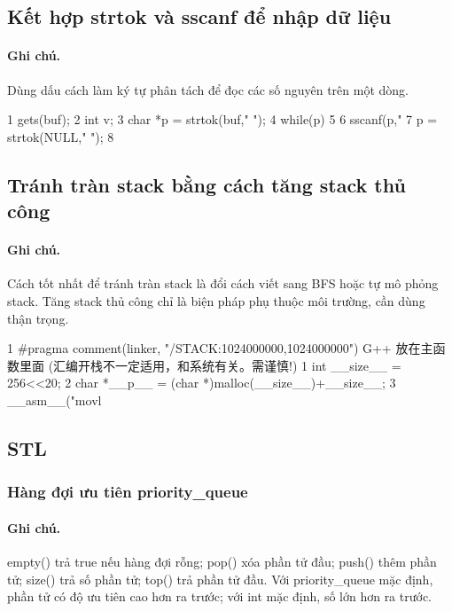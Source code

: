 \documentclass[11pt]{article}
\begin{document}
\subsection{Kết hợp strtok và sscanf để nhập dữ liệu}

\paragraph{Ghi chú.} Dùng dấu cách làm ký tự phân tách để đọc các số nguyên trên một dòng.

\begin{Code}
1               gets(buf);
2               int v;
3               char *p = strtok(buf," ");
4               while(p)
5               {
6                   sscanf(p,"%
7                   p = strtok(NULL," ");
8               }
\end{Code}

\subsection{Tránh tràn stack bằng cách tăng stack thủ công}

\paragraph{Ghi chú.} Cách tốt nhất để tránh tràn stack là đổi cách viết sang BFS hoặc tự mô phỏng stack. Tăng stack thủ công chỉ là biện pháp phụ thuộc môi trường, cần dùng thận trọng.

\begin{Code}
1 #pragma comment(linker, "/STACK:1024000000,1024000000")
     G++
     放在主函数里面 (汇编开栈不一定适用，和系统有关。需谨慎!)
1 int __size__ = 256<<20;
2 char *__p__ = (char *)malloc(__size__)+__size__;
3 __asm__("movl %
\end{Code}

\subsection{STL}

\subsubsection{Hàng đợi ưu tiên priority\_queue}

\paragraph{Ghi chú.} empty() trả true nếu hàng đợi rỗng; pop() xóa phần tử đầu; push() thêm phần tử; size() trả số phần tử; top() trả phần tử đầu. Với priority\_queue mặc định, phần tử có độ ưu tiên cao hơn ra trước; với int mặc định, số lớn hơn ra trước.
\end{document}
